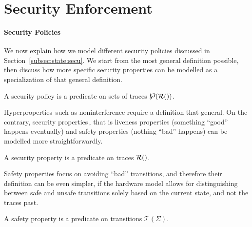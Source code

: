 \section{Security Enforcement}
\label{sec:speccert:security}

\paragraph{Security Policies}
%
We now explain how we model different security policies discussed in
Section~\ref{subsec:state:secu}.
%
We start from the most general definition possible, then discuss how more
specific security properties can be modelled as a specialization of that general
definition.

\begin{definition}
  \label{def:speccert:secpol}
  A security policy is a predicate on sets of traces
  $\powerset(\pathesLTS{Ez})$.
\end{definition}

Hyperproperties\,\cite{clarkson2010hyperproperties} such as noninterference
require a definition that general.
%
On the contrary, security properties\,\cite{schneider2000enforceable}, that is
liveness properties (something ``good'' happens eventually) and safety
properties (nothing ``bad'' happens) can be modelled more straightforwardly.

\begin{definition}
  A security property is a predicate on traces $\pathesLTS{Ez}$.

\end{definition}

Safety properties focus on avoiding ``bad'' transitions, and therefore their
definition can be even simpler, if the hardware model allows for distinguishing
between safe and unsafe transitions solely based on the current state, and not
the traces past.

\begin{definition}
  \label{def:speccert:safetyprop}
  A safety property is a predicate on transitions $\mathcal{T}(\Sigma)$.

\end{definition}

